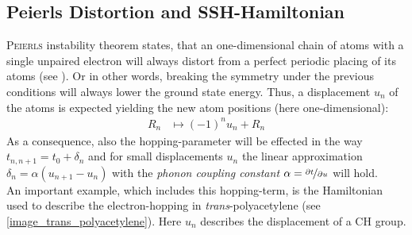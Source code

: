 \subsection{Peierls Distortion and SSH-Hamiltonian}
\label{chapter_Peierls_SSH}
\textsc{Peierls} instability theorem states, that an one-dimensional chain of atoms with a single unpaired electron will always distort from a perfect periodic placing of its atoms (see \cite{chandrasekhar,nalwa}). Or in other words, breaking the symmetry under the previous conditions will always lower the ground state energy.\newpage
Thus, a displacement $u_n$ of the atoms is expected yielding the new atom positions (here one-dimensional):
\begin{align}
	R_n &\mapsto (-1)^{n}u_n + R_n
\end{align}
As a consequence, also the hopping-parameter will be effected in the way $t_{n, n+1} = t_0 + \delta_n$ and for small displacements $u_n$ the linear approximation $\delta_n = \alpha (u_{n+1} - u_n)$ with the \emph{phonon coupling constant} $\alpha = \nicefrac{\partial t}{\partial u}$ will hold.\\
An important example, which includes this hopping-term, is the Hamiltonian used to describe the electron-hopping in \emph{trans}-polyacetylene (see \cref{image_trans_polyacetylene}). Here $u_n$ describes the displacement of a CH group.\\
